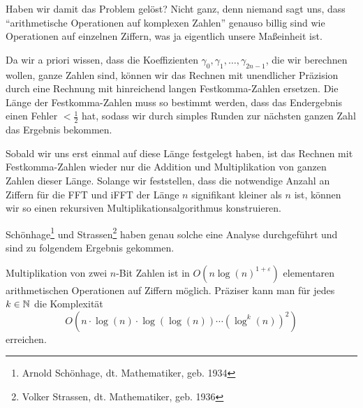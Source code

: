 \begin{remark}
    Haben wir damit das Problem gelöst? Nicht ganz, denn niemand sagt uns, dass \enquote{arithmetische Operationen auf komplexen Zahlen} genauso billig sind wie Operationen auf einzelnen Ziffern, was ja eigentlich unsere Maßeinheit ist.

    \medskip
    Da wir a priori wissen, dass die Koeffizienten $\gamma_0, \gamma_1, \ldots, \gamma_{2n-1}$, die wir berechnen wollen, ganze Zahlen sind, können wir das Rechnen mit unendlicher Präzision durch eine Rechnung mit hinreichend langen Festkomma-Zahlen ersetzen. Die Länge der Festkomma-Zahlen muss so bestimmt werden, dass das Endergebnis einen Fehler $<\frac{1}{2}$ hat, sodass wir durch simples Runden zur nächsten ganzen Zahl das Ergebnis bekommen.

    Sobald wir uns erst einmal auf diese Länge festgelegt haben, ist das Rechnen mit Festkomma-Zahlen wieder nur die Addition und Multiplikation von ganzen Zahlen dieser Länge. Solange wir feststellen, dass die notwendige Anzahl an Ziffern für die FFT und iFFT der Länge $n$ signifikant kleiner als $n$ ist, können wir so einen rekursiven Multiplikationsalgorithmus konstruieren.

    \medskip
    Schönhage\footnote{Arnold Schönhage, dt. Mathematiker, geb. 1934} und Strassen\footnote{Volker Strassen, dt. Mathematiker, geb. 1936} haben genau solche eine Analyse durchgeführt und sind zu folgendem Ergebnis gekommen.
\end{remark}

\begin{theorem}
    Multiplikation von zwei $n$-Bit Zahlen ist in $O(n\log(n)^{1+\varepsilon})$ elementaren arithmetischen Operationen auf Ziffern möglich. Präziser kann man für jedes $k\in\mathbb{N}$ die Komplexität
    \[O(n\cdot \log(n) \cdot \log(\log(n)) \cdots (\log^k(n))^2)\]
    erreichen.
\end{theorem}

